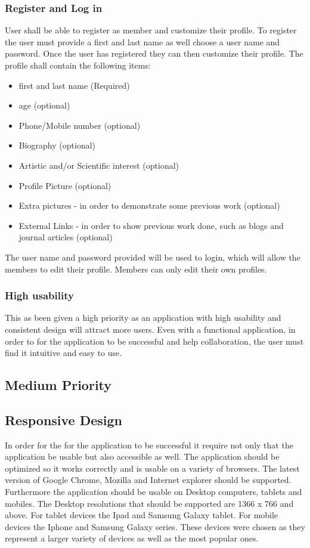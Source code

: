 \documentclass[a4paper,oneside,11pt]{report}
\begin{document}
\subsubsection{Register and Log in} 
 User shall be able to register as member and customize their profile. To register the user must provide a first and last name as well choose a user name and password. Once the user has registered they can then customize their profile. The profile shall contain the following items:
 \begin{itemize}
 \item first and last name (Required)
 \item age (optional)
 \item Phone/Mobile number (optional)
 \item Biography (optional)
 \item Artistic and/or Scientific interest (optional)
 \item Profile Picture (optional)
 \item Extra pictures - in order to demonstrate some previous work (optional)
 \item External Links - in order to show previous work done, such as blogs and journal articles (optional)
 \end{itemize}
 The user name and password provided will be used to login, which will allow the members to edit their profile.
 	Members can only edit their own profiles.
\subsubsection{High usability} 
This as been given a high priority as an application with high usability and consistent design will attract more users. Even with a functional application, in order to for the application to be successful and help collaboration, the user must find it intuitive and easy to use.

\subsection{Medium Priority}
\subsection{Responsive Design}
In order for the for the application to be successful it require not only that the application be usable but also accessible as well. The application should be optimized so it works correctly and is usable on a variety of browsers. The latest version of Google Chrome, Mozilla and Internet explorer should be supported. Furthermore the application should be usable on Desktop computers, tablets and mobiles. The Desktop resolutions that should be supported are 1366 x 766 and above. For tablet devices the Ipad and Samsung Galaxy tablet. For mobile devices the Iphone and Samsung Galaxy series. These devices were chosen as they represent a larger variety of devices as well as the most popular ones.
\end{document}
